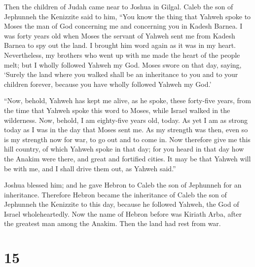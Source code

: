  Then the children of Judah came near to Joshua in Gilgal.
Caleb the son of Jephunneh the Kenizzite said to him, ``You know the
thing that Yahweh spoke to Moses the man of God concerning me and
concerning you in Kadesh Barnea.  I was forty years old when
Moses the servant of Yahweh sent me from Kadesh Barnea to spy out the
land. I brought him word again as it was in my heart. 
Nevertheless, my brothers who went up with me made the heart of the
people melt; but I wholly followed Yahweh my God.  Moses
swore on that day, saying, `Surely the land where you walked shall be an
inheritance to you and to your children forever, because you have wholly
followed Yahweh my God.'

 ``Now, behold, Yahweh has kept me alive, as he spoke,
these forty-five years, from the time that Yahweh spoke this word to
Moses, while Israel walked in the wilderness. Now, behold, I am
eighty-five years old, today.  As yet I am as strong today
as I was in the day that Moses sent me. As my strength was then, even so
is my strength now for war, to go out and to come in.  Now
therefore give me this hill country, of which Yahweh spoke in that day;
for you heard in that day how the Anakim were there, and great and
fortified cities. It may be that Yahweh will be with me, and I shall
drive them out, as Yahweh said.''

 Joshua blessed him; and he gave Hebron to Caleb the son of
Jephunneh for an inheritance.  Therefore Hebron became the
inheritance of Caleb the son of Jephunneh the Kenizzite to this day,
because he followed Yahweh, the God of Israel wholeheartedly.
 Now the name of Hebron before was Kiriath Arba, after the
greatest man among the Anakim. Then the land had rest from war.

\hypertarget{section-14}{%
\section{15}\label{section-14}}

